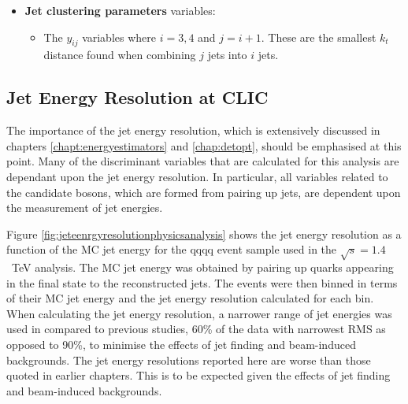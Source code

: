 \begin{itemize}
\item \textbf{Jet clustering parameters} variables:
\begin{itemize}
\item The $y_{ij}$ variables where $i = 3,4$ and $j=i+1$.  These are the smallest $k_{t}$ distance found when combining $j$ jets into $i$ jets.  
\end{itemize}
\end{itemize}


\subsection{Jet Energy Resolution at CLIC} 
\label{sec:jetenergyresolution}
The importance of the jet energy resolution, which is extensively discussed in chapters \ref{chapt:energyestimators} and \ref{chap:detopt}, should be emphasised at this point.  Many of the discriminant variables that are calculated for this analysis are dependant upon the jet energy resolution.  In particular, all variables related to the candidate bosons, which are formed from pairing up jets, are dependent upon the measurement of jet energies.  

Figure \ref{fig:jeteenrgyresolutionphysicsanalysis} shows the jet energy resolution as a function of the MC jet energy for the {\nu}{\nu}qqqq event sample used in the $\sqrt{s}=1.4$~TeV analysis.  The MC jet energy was obtained by pairing up quarks appearing in the final state to the reconstructed jets.  The events were then binned in terms of their MC jet energy and the jet energy resolution calculated for each bin.  When calculating the jet energy resolution, a narrower range of jet energies was used in compared to previous studies, 60\% of the data with narrowest RMS as opposed to 90\%, to minimise the effects of jet finding and beam-induced backgrounds.  The jet energy resolutions reported here are worse than those quoted in earlier chapters.  This is to be expected given the effects of jet finding and beam-induced backgrounds.

